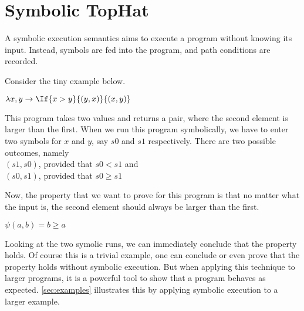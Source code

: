 
\section{Symbolic TopHat}
\label{sec:symbolic}

A symbolic execution semantics aims to execute a program without knowing its input.
Instead, symbols are fed into the program, and path conditions are recorded.

Consider the tiny example below.

\begin{TASK}
  $\lambda x,y \rightarrow \If{x>y}{(y,x)}{(x,y)}$
\end{TASK}

This program takes two values and returns a pair, where the second element is larger than the first.
When we run this program symbolically, we have to enter two symbols for $x$ and $y$, say $s0$ and $s1$ respectively.
There are two possible outcomes, namely\\
$(s1,s0)$, provided that $s0<s1$ and\\
$(s0,s1)$, provided that $s0\geq s1$

Now, the property that we want to prove for this program is that no matter what the input is, the second element should always be larger than the first.

$\psi(a,b)=b\geq a$

Looking at the two symolic runs, we can immediately conclude that the property holds.
Of course this is a trivial example, one can conclude or even prove that the property holds without symbolic execution.
But when applying this technique to larger programs, it is a powerful tool to show that a program behaves as expected.
\cref{sec:examples} illustrates this by applying symbolic execution to a larger example.





